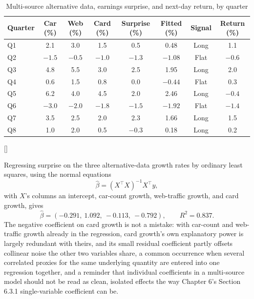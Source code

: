 \documentclass[../ai_in_finance]{subfiles}
\begin{document}
\begin{table}[htbp]
\centering
\begin{lrbox}{\bookmeasuredbox}
\small
\begin{tabular}{lccccccc}
\toprule
Quarter & Car (\%) & Web (\%) & Card (\%) & Surprise (\%) & Fitted (\%) & Signal & Return (\%) \\
\midrule
Q1 & 2.1 & 3.0 & 1.5 & 0.5 & 0.48 & Long & 1.1 \\
Q2 & $-1.5$ & $-0.5$ & $-1.0$ & $-1.3$ & $-1.08$ & Flat & $-0.6$ \\
Q3 & 4.8 & 5.5 & 3.0 & 2.5 & 1.95 & Long & 2.0 \\
Q4 & 0.6 & 1.5 & 0.8 & 0.0 & $-0.44$ & Flat & 0.3 \\
Q5 & 6.2 & 4.0 & 4.5 & 2.0 & 2.46 & Long & $-0.4$ \\
Q6 & $-3.0$ & $-2.0$ & $-1.8$ & $-1.5$ & $-1.92$ & Flat & $-1.4$ \\
Q7 & 3.5 & 2.5 & 2.0 & 2.3 & 1.66 & Long & 1.5 \\
Q8 & 1.0 & 2.0 & 0.5 & $-0.3$ & 0.18 & Long & 0.2 \\
\bottomrule
\end{tabular}
\end{lrbox}
\ifdim\wd\bookmeasuredbox<0.65\linewidth
\setlength{\bookcapwidth}{0.65\linewidth}
\else
\setlength{\bookcapwidth}{\wd\bookmeasuredbox}
\fi
{}[\bookcapwidth]{
\usebox{\bookmeasuredbox}
}{
\caption{Multi-source alternative data, earnings surprise, and next-day return, by quarter}
\label{tab:multisource_signal}
}
\end{table}

Regressing surprise on the three alternative-data growth rates by ordinary least squares, using the normal equations
\begin{equation*}
\hat\beta = (X^\top X)^{-1}X^\top y,
\end{equation*}
with $X$'s columns an intercept, car-count growth, web-traffic growth, and card growth, gives
\begin{equation*}
\hat\beta = (-0.291,\ 1.092,\ -0.113,\ -0.792), \qquad R^2 = 0.837.
\end{equation*}
The negative coefficient on card growth is not a mistake: with car-count and web-traffic growth already in the regression, card growth's own explanatory power is largely redundant with theirs, and its small residual coefficient partly offsets collinear noise the other two variables share, a common occurrence when several correlated proxies for the same underlying quantity are entered into one regression together, and a reminder that individual coefficients in a multi-source model should not be read as clean, isolated effects the way Chapter 6's Section 6.3.1 single-variable coefficient can be.
\end{document}

